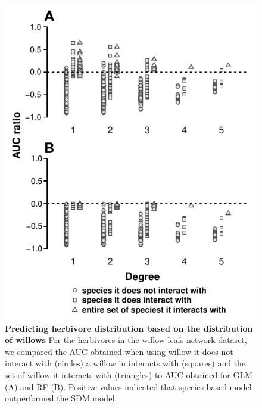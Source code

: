 \begin{figure}[htbp]
\centering
\includegraphics{chapitre3/figS9.pdf}
\caption{\textbf{Predicting herbivore distribution based on the
distribution of willows} For the herbivores in the willow leafs network
dataset, we compared the AUC obtained when using willow it does not
interact with (circles) a willow in interacts with (squares) and the set
of willow it interacts with (triangles) to AUC obtained for GLM (A) and
RF (B). Positive values indicated that species based model outperformed
the SDM model.\label{fig:ratauc}}
\end{figure}

\newpage

\newpage
